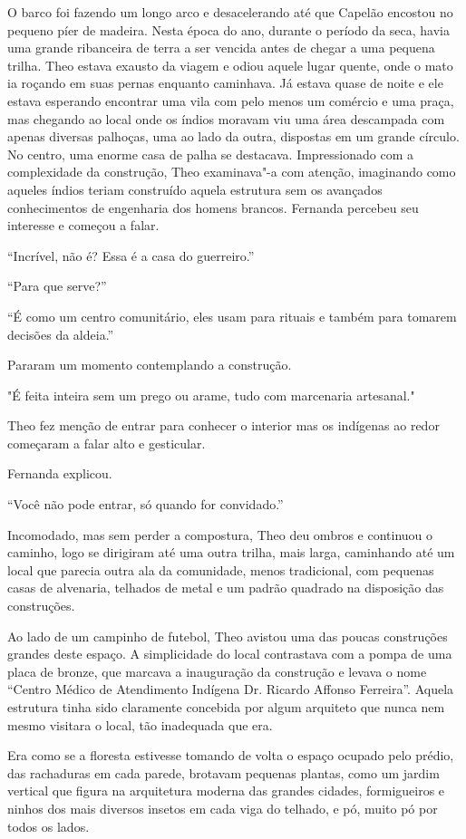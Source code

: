 O barco foi fazendo um longo arco e desacelerando até que Capelão
encostou no pequeno píer de madeira. Nesta época do ano, durante o
período da seca, havia uma grande ribanceira de terra a ser vencida
antes de chegar a uma pequena trilha. Theo estava exausto da viagem e
odiou aquele lugar quente, onde o mato ia roçando em suas pernas
enquanto caminhava. Já estava quase de noite e ele estava esperando
encontrar uma vila com pelo menos um comércio e uma praça, mas chegando
ao local onde os índios moravam viu uma área descampada com apenas
diversas palhoças, uma ao lado da outra, dispostas em um grande círculo.
No centro, uma enorme casa de palha se destacava. Impressionado com a
complexidade da construção, Theo examinava"-a com atenção, imaginando
como aqueles índios teriam construído aquela estrutura sem os avançados
conhecimentos de engenharia dos homens brancos. Fernanda percebeu seu
interesse e começou a falar.

``Incrível, não é? Essa é a casa do guerreiro.''

``Para que serve?''

``É como um centro comunitário, eles usam para rituais e também para
tomarem decisões da aldeia.''

Pararam um momento contemplando a construção.

"É feita inteira sem um prego ou arame, tudo com marcenaria artesanal."

Theo fez menção de entrar para conhecer o interior mas os indígenas ao
redor começaram a falar alto e gesticular.

Fernanda explicou.

``Você não pode entrar, só quando for convidado.''

Incomodado, mas sem perder a compostura, Theo deu ombros e continuou o
caminho, logo se dirigiram até uma outra trilha, mais larga, caminhando
até um local que parecia outra ala da comunidade, menos tradicional, com
pequenas casas de alvenaria, telhados de metal e um padrão quadrado na
disposição das construções.

Ao lado de um campinho de futebol, Theo avistou uma das poucas
construções grandes deste espaço. A simplicidade do local contrastava
com a pompa de uma placa de bronze, que marcava a inauguração da
construção e levava o nome ``Centro Médico de Atendimento Indígena Dr.
Ricardo Affonso Ferreira''. Aquela estrutura tinha sido claramente
concebida por algum arquiteto que nunca nem mesmo visitara o local, tão
inadequada que era.

Era como se a floresta estivesse tomando de volta o espaço ocupado pelo
prédio, das rachaduras em cada parede, brotavam pequenas plantas, como
um jardim vertical que figura na arquitetura moderna das grandes
cidades, formigueiros e ninhos dos mais diversos insetos em cada viga do
telhado, e pó, muito pó por todos os lados.

